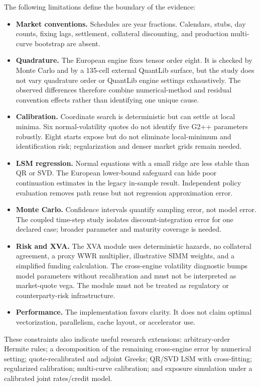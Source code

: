 \documentclass[11pt]{article}
\numberwithin{equation}{section}
\theoremstyle{definition}
\theoremstyle{remark}
\begin{document}
The following limitations define the boundary of the evidence:
\begin{itemize}
  \item \textbf{Market conventions.} Schedules are year fractions. Calendars,
  stubs, day counts, fixing lags, settlement, collateral discounting, and
  production multi-curve bootstrap are absent.
  \item \textbf{Quadrature.} The European engine fixes tensor order eight.
  It is checked by Monte Carlo and by a 135-cell external QuantLib surface, but
  the study does not vary quadrature order or QuantLib engine settings
  exhaustively. The observed differences therefore combine numerical-method and
  residual convention effects rather than identifying one unique cause.
  \item \textbf{Calibration.} Coordinate search is deterministic but can settle
  at local minima. Six normal-volatility quotes do not identify five G2++
  parameters robustly. Eight starts expose but do not eliminate local-minimum
  and identification risk; regularization and denser market grids remain needed.
  \item \textbf{LSM regression.} Normal equations with a small ridge are less
  stable than QR or SVD. The European lower-bound safeguard can hide poor
  continuation estimates in the legacy in-sample result. Independent policy
  evaluation removes path reuse but not regression approximation error.
  \item \textbf{Monte Carlo.} Confidence intervals quantify sampling error,
  not model error. The coupled time-step study isolates discount-integration
  error for one declared case; broader parameter and maturity coverage is needed.
  \item \textbf{Risk and XVA.} The XVA module uses deterministic hazards, no
  collateral agreement, a proxy WWR multiplier, illustrative SIMM weights, and
  a simplified funding calculation. The cross-engine volatility diagnostic
  bumps model parameters without recalibration and must not be interpreted as
  market-quote vega. The module must not be treated as regulatory or
  counterparty-risk infrastructure.
  \item \textbf{Performance.} The implementation favors clarity. It does not
  claim optimal vectorization, parallelism, cache layout, or accelerator use.
\end{itemize}

These constraints also indicate useful research extensions: arbitrary-order
Hermite rules; a decomposition of the remaining cross-engine error by numerical
setting; quote-recalibrated and adjoint Greeks; QR/SVD LSM with cross-fitting;
regularized calibration; multi-curve calibration; and exposure simulation under
a calibrated joint rates/credit model.
\end{document}
